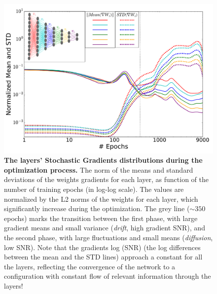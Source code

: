 \documentclass[11pt]{article}
\begin{document}
\begin{figure}[ht]
\vskip -0.0in
\centerline{\includegraphics[width=\textwidth]{log_log_gradients_with_network}}
\caption{\textbf{The layers' Stochastic Gradients distributions during the optimization process.} The norm of the means and standard deviations of the weights gradients for each layer, as function of the number of training epochs (in log-log scale). The values are normalized by the L2 norms of the weights for each layer, which significantly increase during the optimization. The grey line ($\sim350$ epochs) marks the transition between the first phase, with large gradient means and small variance (\emph{drift}, high gradient SNR), and the second phase, with large fluctuations and small means (\emph{diffusion}, low SNR). Note that the gradients log (SNR) (the log differences between the mean and the STD lines) approach a constant for all the layers, reflecting the convergence of the network to a configuration with constant flow of relevant information through the layers!    
}
\label{fig:gradients}
\vskip -0.1in
\end{figure}
\end{document}
